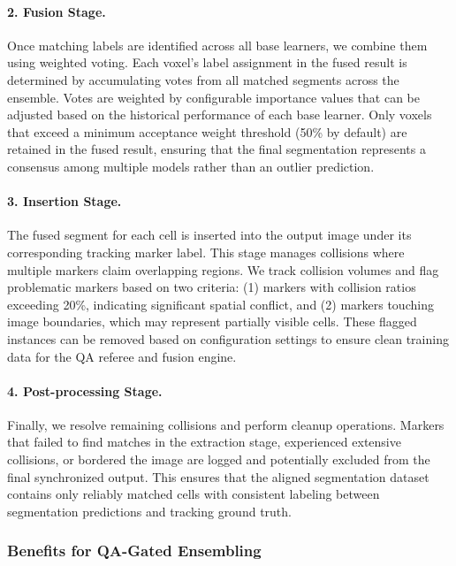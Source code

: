 \paragraph{2. Fusion Stage.}
Once matching labels are identified across all base learners, we combine them using weighted
voting. Each voxel's label assignment in the fused result is determined by accumulating votes from
all matched segments across the ensemble. Votes are weighted by configurable importance values that
can be adjusted based on the historical performance of each base learner. Only voxels that exceed a
minimum acceptance weight threshold (50\% by default) are retained in the fused result, ensuring
that the final segmentation represents a consensus among multiple models rather than an outlier
prediction.

\paragraph{3. Insertion Stage.}
The fused segment for each cell is inserted into the output image under its corresponding tracking
marker label. This stage manages collisions where multiple markers claim overlapping regions. We
track collision volumes and flag problematic markers based on two criteria: (1) markers with
collision ratios exceeding 20\%, indicating significant spatial conflict, and (2) markers touching
image boundaries, which may represent partially visible cells. These flagged instances can be
removed based on configuration settings to ensure clean training data for the QA referee and fusion
engine.

\paragraph{4. Post-processing Stage.}
Finally, we resolve remaining collisions and perform cleanup operations. Markers that failed to
find matches in the extraction stage, experienced extensive collisions, or bordered the image are
logged and potentially excluded from the final synchronized output. This ensures that the aligned
segmentation dataset contains only reliably matched cells with consistent labeling between
segmentation predictions and tracking ground truth.

\subsubsection{Benefits for QA-Gated Ensembling}

